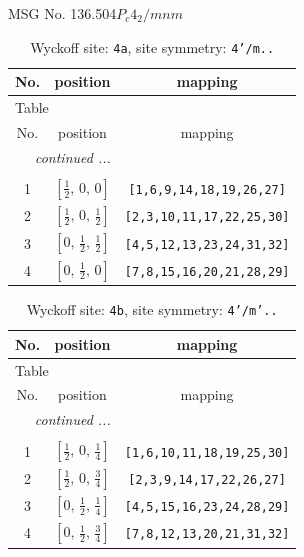 \documentclass[fleqn,8pt]{jsarticle}
\begin{document}
\setcounter{MaxMatrixCols}{32}

\renewcommand{\tablename}{Table~}
\renewcommand{\figurename}{Figure~}
\begin{center}
\LARGE
MSG No. 136.504\quad$P_{c}4_{2}/mnm$
\end{center}
\renewcommand{\arraystretch}{1.2}
\begin{longtable}{ccc}
\caption{Wyckoff site: {\tt 4a}, site symmetry: {\tt 4'/m..}}
 \\
 \hline \hline
No. & position & mapping \\ \hline \endfirsthead

\multicolumn{2}{l}{\tablename\ \thetable{}} \\
 \hline \hline
No. & position & mapping \\ \hline \endhead

 \hline \hline
\multicolumn{2}{r}{\footnotesize\it continued ...} \\ \endfoot

 \hline \hline
\multicolumn{2}{r}{} \\ \endlastfoot

1 & $\left[ \frac{1}{2},\, 0,\, 0 \right]$ & {\tt [1,6,9,14,18,19,26,27]} \\ \hline
2 & $\left[ \frac{1}{2},\, 0,\, \frac{1}{2} \right]$ & {\tt [2,3,10,11,17,22,25,30]} \\ \hline
3 & $\left[ 0,\, \frac{1}{2},\, \frac{1}{2} \right]$ & {\tt [4,5,12,13,23,24,31,32]} \\ \hline
4 & $\left[ 0,\, \frac{1}{2},\, 0 \right]$ & {\tt [7,8,15,16,20,21,28,29]} \\
\end{longtable}
\renewcommand{\arraystretch}{1.2}
\begin{longtable}{ccc}
\caption{Wyckoff site: {\tt 4b}, site symmetry: {\tt 4'/m'..}}
 \\
 \hline \hline
No. & position & mapping \\ \hline \endfirsthead

\multicolumn{2}{l}{\tablename\ \thetable{}} \\
 \hline \hline
No. & position & mapping \\ \hline \endhead

 \hline \hline
\multicolumn{2}{r}{\footnotesize\it continued ...} \\ \endfoot

 \hline \hline
\multicolumn{2}{r}{} \\ \endlastfoot

1 & $\left[ \frac{1}{2},\, 0,\, \frac{1}{4} \right]$ & {\tt [1,6,10,11,18,19,25,30]} \\ \hline
2 & $\left[ \frac{1}{2},\, 0,\, \frac{3}{4} \right]$ & {\tt [2,3,9,14,17,22,26,27]} \\ \hline
3 & $\left[ 0,\, \frac{1}{2},\, \frac{1}{4} \right]$ & {\tt [4,5,15,16,23,24,28,29]} \\ \hline
4 & $\left[ 0,\, \frac{1}{2},\, \frac{3}{4} \right]$ & {\tt [7,8,12,13,20,21,31,32]} \\
\end{longtable}
\end{document}
